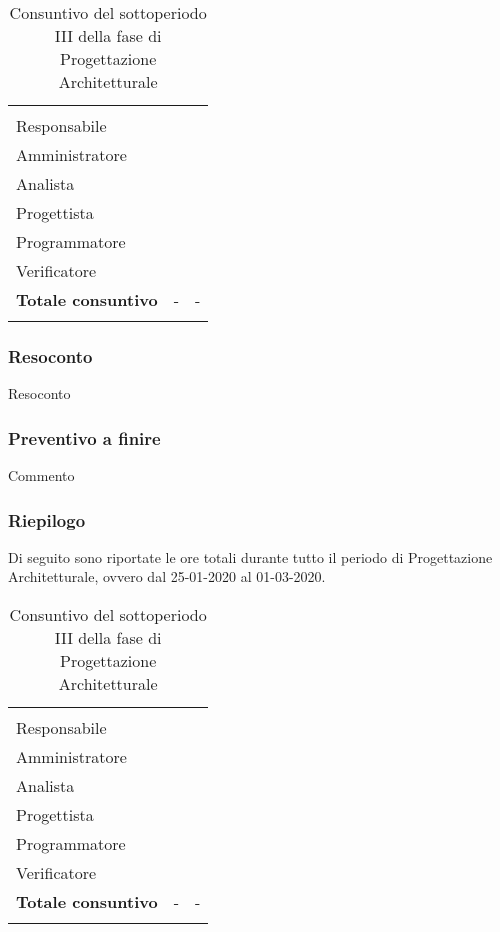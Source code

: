 \begin{longtable}{ C{4cm} C{3cm} C{3.5cm}} 
 	 &
 	 &
 	 \\
 	
 	Responsabile &  & \\
 	Amministratore &  & \\
 	Analista & & \\
 	Progettista & & \\
 	Programmatore & &\\
 	Verificatore & & \\
 	
	\hline 	
 	
 	\textbf{Totale consuntivo} &
	- \color{coloreRosso}{\textbf{(+--)}} &
 	- \\	
 	
 	\caption{Consuntivo del sottoperiodo III della fase di Progettazione Architetturale}
\end{longtable}

\vspace{-1cm}

\subsubsection{Resoconto}
Resoconto
\subsubsection{Preventivo a finire}
Commento

\subsubsection{Riepilogo}

Di seguito sono riportate le ore totali durante tutto il periodo di Progettazione Architetturale, ovvero dal 25-01-2020 al 01-03-2020.

\begin{longtable}{ C{4cm} C{3cm} C{3.5cm}} 
 	 &
 	 &
 	 \\
 	
 	Responsabile &  & \\
 	Amministratore &  & \\
 	Analista & & \\
 	Progettista & & \\
 	Programmatore & &\\
 	Verificatore & & \\
 	
	\hline 	
 	
 	\textbf{Totale consuntivo} &
	- \color{coloreRosso}{\textbf{(+--)}} &
 	- \\	
 	
 	\caption{Consuntivo del sottoperiodo III della fase di Progettazione Architetturale}
\end{longtable}

